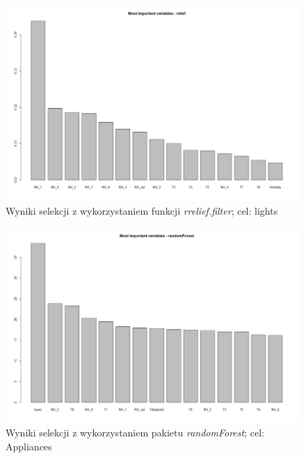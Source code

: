 \documentclass[a4paper,11pt,twoside]{mwrep}  %
\begin{document}
 \begin{figure}[!h]
    \centering \includegraphics[scale=0.4]{../relief_lights.png}
    \caption{Wyniki selekcji z wykorzystaniem  funkcji \textit{rrelief.filter}; cel: lights}
    \label{fig:relief_lights}
\end{figure}

 \begin{figure}[!h]
    \centering \includegraphics[scale=0.4]{../rf_app.png}
    \caption{Wyniki selekcji z wykorzystaniem pakietu \textit{randomForest}; cel: Appliances}
    \label{fig:rf_app}
\end{figure}
\end{document}
